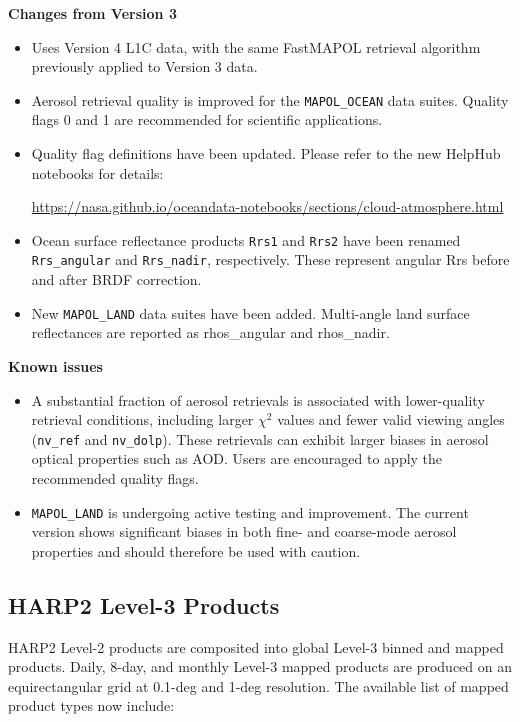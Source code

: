 \documentclass[
  11pt,
  letterpaper,
]{scrreprt}
\begin{document}
\textbf{Changes from Version 3}

\begin{itemize}
\item
  Uses Version 4 L1C data, with the same FastMAPOL retrieval algorithm
  previously applied to Version 3 data.
\item
  Aerosol retrieval quality is improved for the \texttt{MAPOL\_OCEAN}
  data suites. Quality flags 0 and 1 are recommended for scientific
  applications.
\item
  Quality flag definitions have been updated. Please refer to the new
  HelpHub notebooks for details:

  \url{https://nasa.github.io/oceandata-notebooks/sections/cloud-atmosphere.html}
\item
  Ocean surface reflectance products \texttt{Rrs1} and \texttt{Rrs2}
  have been renamed \texttt{Rrs\_angular} and \texttt{Rrs\_nadir},
  respectively. These represent angular Rrs before and after BRDF
  correction.
\item
  New \texttt{MAPOL\_LAND} data suites have been added. Multi-angle land
  surface reflectances are reported as rhos\_angular and rhos\_nadir.
\end{itemize}

\textbf{Known issues}

\begin{itemize}
\item
  A substantial fraction of aerosol retrievals is associated with
  lower-quality retrieval conditions, including larger \(\chi^2\) values
  and fewer valid viewing angles (\texttt{nv\_ref} and
  \texttt{nv\_dolp}). These retrievals can exhibit larger biases in
  aerosol optical properties such as AOD. Users are encouraged to apply
  the recommended quality flags.
\item
  \texttt{MAPOL\_LAND} is undergoing active testing and improvement. The
  current version shows significant biases in both fine- and coarse-mode
  aerosol properties and should therefore be used with caution.
\end{itemize}

\subsection*{HARP2 Level-3 Products}\label{harp2-level-3-products}

HARP2 Level-2 products are composited into global Level-3 binned and
mapped products. Daily, 8-day, and monthly Level-3 mapped products are
produced on an equirectangular grid at 0.1-deg and 1-deg resolution. The
available list of mapped product types now include:
\end{document}
